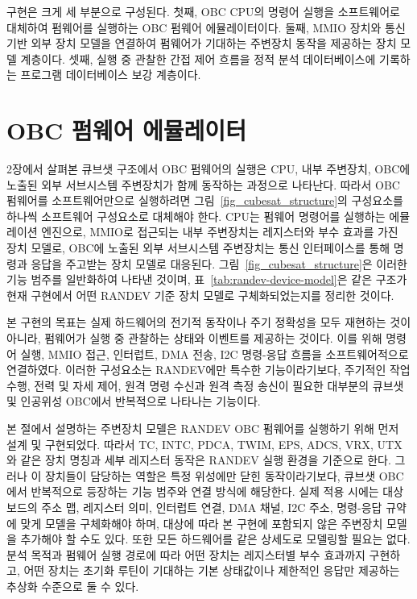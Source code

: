 \documentclass[master,korean,final]{kaist-ucs}
\begin{document}
구현은 크게 세 부분으로 구성된다. 첫째, OBC CPU의 명령어 실행을 소프트웨어로 대체하여 펌웨어를 실행하는 OBC 펌웨어 에뮬레이터이다. 둘째, MMIO 장치와 통신 기반 외부 장치 모델을 연결하여 펌웨어가 기대하는 주변장치 동작을 제공하는 장치 모델 계층이다. 셋째, 실행 중 관찰한 간접 제어 흐름을 정적 분석 데이터베이스에 기록하는 프로그램 데이터베이스 보강 계층이다.

\section{OBC 펌웨어 에뮬레이터}

2장에서 살펴본 큐브샛 구조에서 OBC 펌웨어의 실행은 CPU, 내부 주변장치, OBC에 노출된 외부 서브시스템 주변장치가 함께 동작하는 과정으로 나타난다. 따라서 OBC 펌웨어를 소프트웨어만으로 실행하려면 그림~\ref{fig_cubesat_structure}의 구성요소를 하나씩 소프트웨어 구성요소로 대체해야 한다. CPU는 펌웨어 명령어를 실행하는 에뮬레이션 엔진으로, MMIO로 접근되는 내부 주변장치는 레지스터와 부수 효과를 가진 장치 모델로, OBC에 노출된 외부 서브시스템 주변장치는 통신 인터페이스를 통해 명령과 응답을 주고받는 장치 모델로 대응된다. 그림~\ref{fig_cubesat_structure}은 이러한 기능 범주를 일반화하여 나타낸 것이며, 표~\ref{tab:randev-device-model}은 같은 구조가 현재 구현에서 어떤 RANDEV 기준 장치 모델로 구체화되었는지를 정리한 것이다.

본 구현의 목표는 실제 하드웨어의 전기적 동작이나 주기 정확성을 모두 재현하는 것이 아니라, 펌웨어가 실행 중 관찰하는 상태와 이벤트를 제공하는 것이다. 이를 위해 명령어 실행, MMIO 접근, 인터럽트, DMA 전송, I2C 명령-응답 흐름을 소프트웨어적으로 연결하였다. 이러한 구성요소는 RANDEV에만 특수한 기능이라기보다, 주기적인 작업 수행, 전력 및 자세 제어, 원격 명령 수신과 원격 측정 송신이 필요한 대부분의 큐브샛 및 인공위성 OBC에서 반복적으로 나타나는 기능이다.

본 절에서 설명하는 주변장치 모델은 RANDEV OBC 펌웨어를 실행하기 위해 먼저 설계 및 구현되었다. 따라서 TC, INTC, PDCA, TWIM, EPS, ADCS, VRX, UTX와 같은 장치 명칭과 세부 레지스터 동작은 RANDEV 실행 환경을 기준으로 한다. 그러나 이 장치들이 담당하는 역할은 특정 위성에만 닫힌 동작이라기보다, 큐브샛 OBC에서 반복적으로 등장하는 기능 범주와 연결 방식에 해당한다. 실제 적용 시에는 대상 보드의 주소 맵, 레지스터 의미, 인터럽트 연결, DMA 채널, I2C 주소, 명령-응답 규약에 맞게 모델을 구체화해야 하며, 대상에 따라 본 구현에 포함되지 않은 주변장치 모델을 추가해야 할 수도 있다. 또한 모든 하드웨어를 같은 상세도로 모델링할 필요는 없다. 분석 목적과 펌웨어 실행 경로에 따라 어떤 장치는 레지스터별 부수 효과까지 구현하고, 어떤 장치는 초기화 루틴이 기대하는 기본 상태값이나 제한적인 응답만 제공하는 추상화 수준으로 둘 수 있다.
\end{document}
